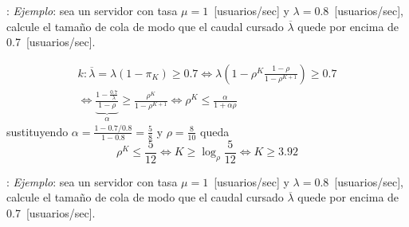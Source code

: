 \documentclass[xcolor={x11names}]{beamer}
\begin{document}
\begin{frame}{\secname: \subsecname}
    \textit{Ejemplo}: sea un servidor con
    tasa $\mu=1$~[usuarios/sec] y
    $\lambda=0.8$~[usuarios/sec], calcule
    el tamaño de cola de modo que el
    caudal cursado $\overline{\lambda}$
    quede por encima de 0.7~[usuarios/sec].

    \vfill

    \begin{multline*}
        k: \overline{\lambda}=
        \lambda(1-\pi_K)\geq0.7
        \Longleftrightarrow
        \lambda\left(1-\rho^K\frac{1-\rho}{1-\rho^{K+1}} \right)
        \geq0.7\\
        \Longleftrightarrow
        \underbrace{\frac{1-\frac{0.7}{\lambda}}{1-\rho}}_{\alpha}
        \geq \frac{\rho^K}{1-\rho^{K+1}}
        \Longleftrightarrow
        \rho^K\leq \frac{\alpha}{1+\alpha\rho}
    \end{multline*}
    sustituyendo $\alpha=\tfrac{1-0.7/0.8}{1-0.8}=\tfrac{5}{8}$
    y $\rho=\tfrac{8}{10}$
    queda
    \begin{equation*}
        \rho^K\leq\frac{5}{12}
        \Longleftrightarrow
        K\geq\log_\rho\frac{5}{12}
        \Longleftrightarrow
        K\geq 3.92
    \end{equation*}
\end{frame}




\begin{frame}{\secname: \subsecname}
    \textit{Ejemplo}: sea un servidor con
    tasa $\mu=1$~[usuarios/sec] y
    $\lambda=0.8$~[usuarios/sec], calcule
    el tamaño de cola de modo que el
    caudal cursado $\overline{\lambda}$
    quede por encima de 0.7~[usuarios/sec].

    \vfill

    \begin{figure}
        
    \end{figure}
\end{frame}
\end{document}
